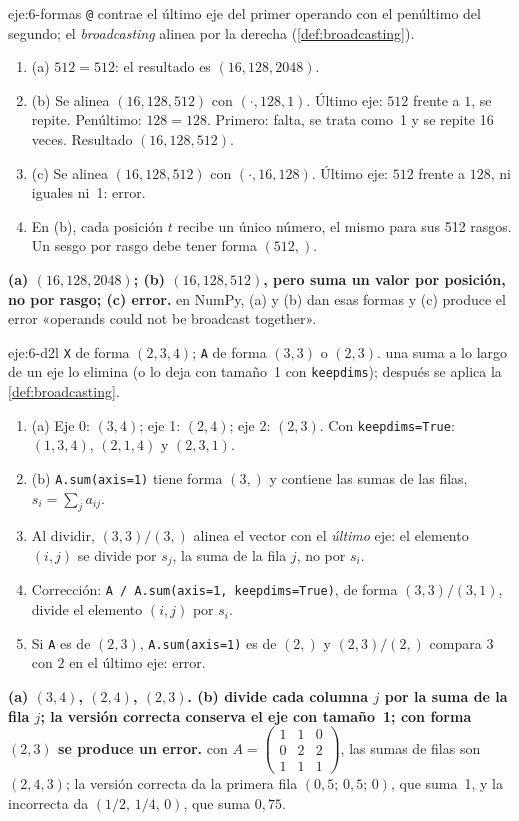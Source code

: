 \begin{solucion}{eje:6-formas}
\planteamiento \texttt{@} contrae el último eje del primer operando con el penúltimo del segundo; el \emph{broadcasting} alinea por la derecha (\cref{def:broadcasting}).
\pasos
\begin{enumerate}[label=\arabic*.]
  \item (a) $512=512$: el resultado es $(16,128,2048)$.
  \item (b) Se alinea $(16,128,512)$ con $(\cdot,128,1)$. Último eje: $512$ frente a $1$, se repite. Penúltimo: $128=128$. Primero: falta, se trata como~1 y se repite 16 veces. Resultado $(16,128,512)$.
  \item (c) Se alinea $(16,128,512)$ con $(\cdot,16,128)$. Último eje: $512$ frente a $128$, ni iguales ni~1: error.
  \item En (b), cada posición $t$ recibe un único número, el mismo para sus 512 rasgos. Un sesgo por rasgo debe tener forma $(512,)$.
\end{enumerate}
\resultado \textbf{(a) $(16,128,2048)$; (b) $(16,128,512)$, pero suma un valor por posición, no por rasgo; (c) error.}
\comprobacion en NumPy, (a) y (b) dan esas formas y (c) produce el error «operands could not be broadcast together».
\end{solucion}

\begin{solucion}{eje:6-d2l}
\datos \texttt{X} de forma $(2,3,4)$; \texttt{A} de forma $(3,3)$ o $(2,3)$.
\planteamiento una suma a lo largo de un eje lo elimina (o lo deja con tamaño~1 con \texttt{keepdims}); después se aplica la \cref{def:broadcasting}.
\pasos
\begin{enumerate}[label=\arabic*.]
  \item (a) Eje 0: $(3,4)$; eje 1: $(2,4)$; eje 2: $(2,3)$. Con \texttt{keepdims=True}: $(1,3,4)$, $(2,1,4)$ y $(2,3,1)$.
  \item (b) \texttt{A.sum(axis=1)} tiene forma $(3,)$ y contiene las sumas de las filas, $s_i=\sum_ja_{ij}$.
  \item Al dividir, $(3,3)/(3,)$ alinea el vector con el \emph{último} eje: el elemento $(i,j)$ se divide por $s_j$, la suma de la fila $j$, no por $s_i$.
  \item Corrección: \texttt{A / A.sum(axis=1, keepdims=True)}, de forma $(3,3)/(3,1)$, divide el elemento $(i,j)$ por $s_i$.
  \item Si \texttt{A} es de $(2,3)$, \texttt{A.sum(axis=1)} es de $(2,)$ y $(2,3)/(2,)$ compara $3$ con $2$ en el último eje: error.
\end{enumerate}
\resultado \textbf{(a) $(3,4)$, $(2,4)$, $(2,3)$. (b) divide cada columna $j$ por la suma de la fila $j$; la versión correcta conserva el eje con tamaño~1; con forma $(2,3)$ se produce un error.}
\comprobacion con $A=\begin{pmatrix}1&1&0\\0&2&2\\1&1&1\end{pmatrix}$, las sumas de filas son $(2,4,3)$; la versión correcta da la primera fila $(0{,}5;\,0{,}5;\,0)$, que suma~1, y la incorrecta da $(1/2,\,1/4,\,0)$, que suma $0{,}75$.
\end{solucion}


